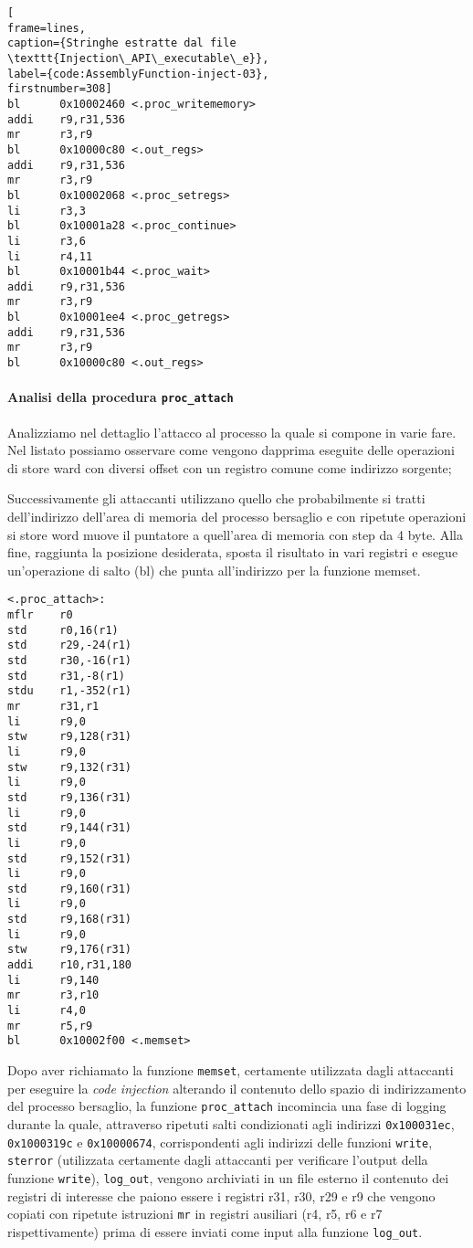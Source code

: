 \documentclass[10pt,a4paper, titlepage]{report}
\begin{document}
\begin{lstlisting}[
frame=lines, 
caption={Stringhe estratte dal file \texttt{Injection\_API\_executable\_e}}, 
label={code:AssemblyFunction-inject-03},
firstnumber=308]
bl      0x10002460 <.proc_writememory>
addi    r9,r31,536
mr      r3,r9
bl      0x10000c80 <.out_regs>
addi    r9,r31,536
mr      r3,r9
bl      0x10002068 <.proc_setregs>
li      r3,3
bl      0x10001a28 <.proc_continue>
li      r3,6
li      r4,11
bl      0x10001b44 <.proc_wait>
addi    r9,r31,536
mr      r3,r9
bl      0x10001ee4 <.proc_getregs>
addi    r9,r31,536
mr      r3,r9
bl      0x10000c80 <.out_regs>
\end{lstlisting}

\paragraph{Analisi della procedura \texttt{proc\_attach}}

Analizziamo nel dettaglio l'attacco al processo la quale si compone in varie fare.
Nel listato possiamo osservare come vengono dapprima eseguite delle operazioni di store ward con diversi offset con un registro comune come indirizzo sorgente; 

Successivamente gli attaccanti utilizzano quello che probabilmente si tratti dell'indirizzo dell'area di memoria del processo bersaglio e con ripetute operazioni si store word muove il puntatore a quell'area di memoria con step da 4 byte. Alla fine, raggiunta la posizione desiderata, sposta il risultato in vari registri e esegue un'operazione di salto (bl) che punta all'indirizzo per la funzione memset.

\begin{lstlisting}
<.proc_attach>:
mflr    r0
std     r0,16(r1)
std     r29,-24(r1)
std     r30,-16(r1)
std     r31,-8(r1)
stdu    r1,-352(r1)
mr      r31,r1
li      r9,0
stw     r9,128(r31)
li      r9,0
stw     r9,132(r31)
li      r9,0
std     r9,136(r31)
li      r9,0
std     r9,144(r31)
li      r9,0
std     r9,152(r31)
li      r9,0
std     r9,160(r31)
li      r9,0
std     r9,168(r31)
li      r9,0
stw     r9,176(r31)
addi    r10,r31,180
li      r9,140
mr      r3,r10
li      r4,0
mr      r5,r9
bl      0x10002f00 <.memset>
\end{lstlisting}

Dopo aver richiamato la funzione \texttt{memset}, certamente utilizzata dagli attaccanti per eseguire la \textit{code injection} alterando il contenuto dello spazio di indirizzamento del processo bersaglio, la funzione \texttt{proc\_attach} incomincia una fase di logging durante la quale, attraverso ripetuti salti condizionati agli indirizzi \texttt{0x100031ec}, \texttt{0x1000319c} e \texttt{0x10000674}, corrispondenti agli indirizzi delle funzioni \texttt{write}, \texttt{sterror} (utilizzata certamente dagli attaccanti per verificare l'output della funzione \texttt{write}), \texttt{log\_out}, vengono archiviati in un file esterno il contenuto dei registri di interesse che paiono essere i registri r31, r30, r29 e r9 che vengono copiati con ripetute istruzioni \texttt{mr} in registri ausiliari (r4, r5, r6 e r7 rispettivamente) prima di essere inviati come input alla funzione \texttt{log\_out}.
\end{document}
